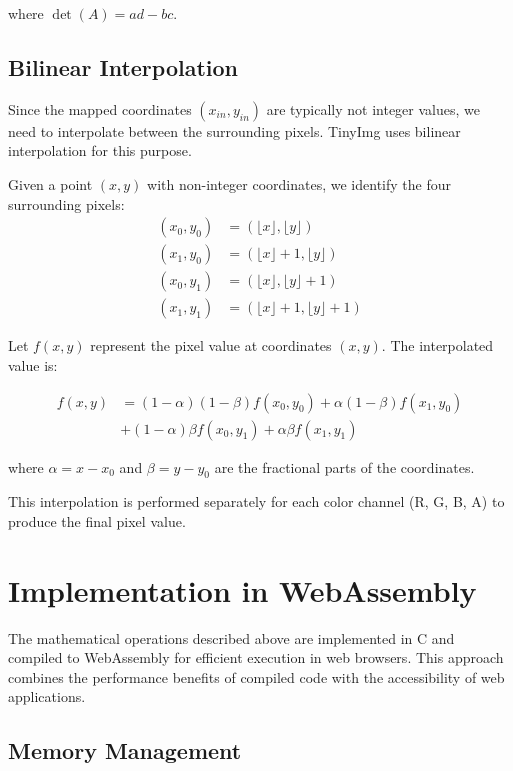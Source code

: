 \documentclass{article}
\begin{document}
where $\det(A) = ad - bc$.

\subsection{Bilinear Interpolation}

Since the mapped coordinates $(x_{in}, y_{in})$ are typically not integer values, we need to interpolate between the surrounding pixels. TinyImg uses bilinear interpolation for this purpose.

Given a point $(x, y)$ with non-integer coordinates, we identify the four surrounding pixels:
\begin{align}
(x_0, y_0) &= (\lfloor x \rfloor, \lfloor y \rfloor) \\
(x_1, y_0) &= (\lfloor x \rfloor + 1, \lfloor y \rfloor) \\
(x_0, y_1) &= (\lfloor x \rfloor, \lfloor y \rfloor + 1) \\
(x_1, y_1) &= (\lfloor x \rfloor + 1, \lfloor y \rfloor + 1)
\end{align}

Let $f(x,y)$ represent the pixel value at coordinates $(x,y)$. The interpolated value is:

\begin{equation}
\begin{split}
f(x,y) &= (1-\alpha)(1-\beta)f(x_0,y_0) + \alpha(1-\beta)f(x_1,y_0) \\
&+ (1-\alpha)\beta f(x_0,y_1) + \alpha\beta f(x_1,y_1)
\end{split}
\end{equation}

where $\alpha = x - x_0$ and $\beta = y - y_0$ are the fractional parts of the coordinates.

This interpolation is performed separately for each color channel (R, G, B, A) to produce the final pixel value.

\section{Implementation in WebAssembly}

The mathematical operations described above are implemented in C and compiled to WebAssembly for efficient execution in web browsers. This approach combines the performance benefits of compiled code with the accessibility of web applications.

\subsection{Memory Management}
\end{document}
